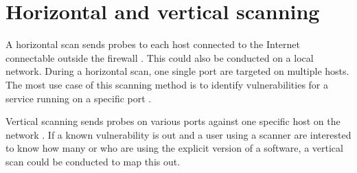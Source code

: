 \section{Horizontal and vertical scanning}
\label{s:HorizontalScanning}
A horizontal scan sends probes to each host connected to the Internet connectable outside the firewall \autocite{leonard2012stochastic}. This could also be conducted on a local network. During a horizontal scan, one single port are targeted on multiple hosts. The most use case of this scanning method is to identify vulnerabilities for a service running on a specific port \autocite{TaxonomyOfNetworkScanning}.

\label{s:VerticalScanning}
Vertical scanning sends probes on various ports against one specific host on the network \autocite{TaxonomyOfNetworkScanning}.
If a known vulnerability is out and a user using a scanner are interested to know how many or who are using the explicit version of a software, a vertical scan could be conducted to map this out.
